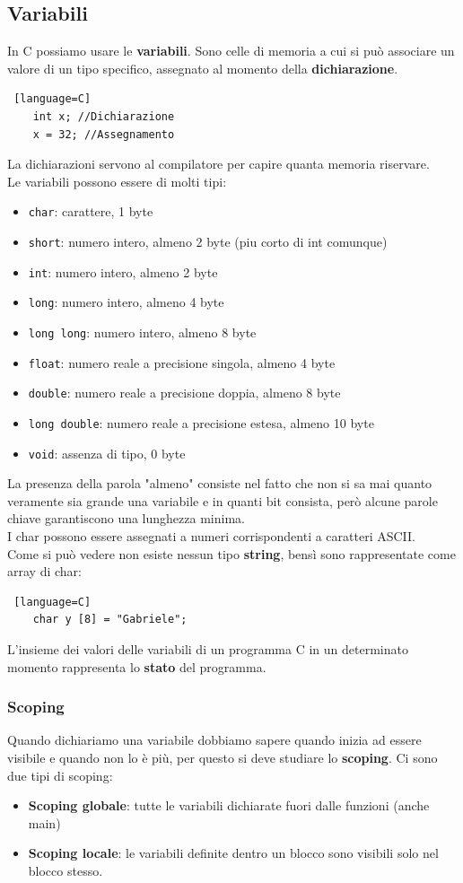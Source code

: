 \documentclass[12pt,a4paper]{article}
\begin{document}
\subsection{Variabili}
In C possiamo usare le \textbf{variabili}. Sono celle di memoria a cui si può associare un valore di un tipo specifico, assegnato al momento della \textbf{dichiarazione}.
\begin{lstlisting} [language=C]
    int x; //Dichiarazione
    x = 32; //Assegnamento
\end{lstlisting}
La dichiarazioni servono al compilatore per capire quanta memoria riservare.\\
Le variabili possono essere di molti tipi:
\begin{itemize}
    \item \texttt{char}: carattere, 1 byte
    \item \texttt{short}: numero intero, almeno 2 byte (piu corto di int comunque)
    \item \texttt{int}: numero intero, almeno 2 byte
    \item \texttt{long}: numero intero, almeno 4 byte
    \item \texttt{long long}: numero intero, almeno 8 byte
    \item \texttt{float}: numero reale a precisione singola, almeno 4 byte
    \item \texttt{double}: numero reale a precisione doppia, almeno 8 byte
    \item \texttt{long double}: numero reale a precisione estesa, almeno 10 byte
    \item \texttt{void}: assenza di tipo, 0 byte
\end{itemize}
La presenza della parola "almeno" consiste nel fatto che non si sa mai quanto veramente sia grande una variabile e in quanti bit consista, però alcune parole chiave garantiscono una lunghezza minima.\\
I char possono essere assegnati a numeri corrispondenti a caratteri ASCII.\\
Come si può vedere non esiste nessun tipo \textbf{string}, bensì sono rappresentate come array di char:
\begin{lstlisting} [language=C]
    char y [8] = "Gabriele";
\end{lstlisting}
L'insieme dei valori delle variabili di un programma C in un determinato momento rappresenta lo \textbf{stato} del programma.
\subsubsection{Scoping}
Quando dichiariamo una variabile dobbiamo sapere quando inizia ad essere visibile e quando non lo è più, per questo si deve studiare lo \textbf{scoping}. Ci sono due tipi di scoping:
\begin{itemize}
    \item \textbf{Scoping globale}: tutte le variabili dichiarate fuori dalle funzioni (anche main)
    \item \textbf{Scoping locale}: le variabili definite dentro un blocco sono visibili solo nel blocco stesso.
\end{itemize}
\end{document}

